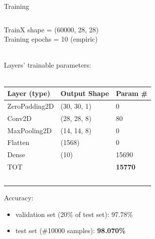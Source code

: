 \documentclass[10pt, xcolor=dvipsnames, compress]{beamer}
\begin{document}
\begin{frame}{Training}

\begin{columns}[T]
    \begin{column}{.6\textwidth}

        TrainX shape = (60000, 28, 28)\\
        Training epochs = 10 (empiric)\\~\

        Layers' trainable parameters:\\~\

        {
        \tiny
        \begin{tabular}{lll}
            Layer (type) & Output Shape & Param \# \\
            \hline
            ZeroPadding2D & (30, 30, 1) & 0 \\
            Conv2D & (28, 28, 8) & 80 \\
            MaxPooling2D & (14, 14, 8) & 0 \\
            Flatten & (1568) & 0 \\
            Dense & (10) & 15690 \\
            \hline
            TOT &  & \textbf{15770} \\~\

        \end{tabular}
        }

        Accuracy:
        \begin{itemize}
            \item validation set (20\% of test set): 97.78\%
            \item test set (\#10000 samples): \textbf{98.070\%}\\~\
        \end{itemize}



\end{column}
\end{columns}
\end{frame}
\end{document}
